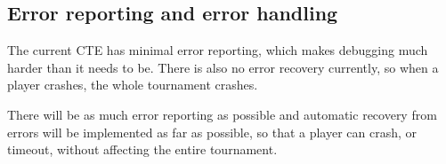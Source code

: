 \documentclass[a4paper, 12pt]{article}
\begin{document}
\subsection{Error reporting and error handling}

The current CTE has minimal error reporting, which makes debugging much harder
than it needs to be. There is also no error recovery currently, so when a player
crashes, the whole tournament crashes.

\vspace{0.8em}
There will be as much error reporting as possible and automatic recovery from
errors will be implemented as far as possible, so that a player can crash, or
timeout, without affecting the entire tournament.
\end{document}
